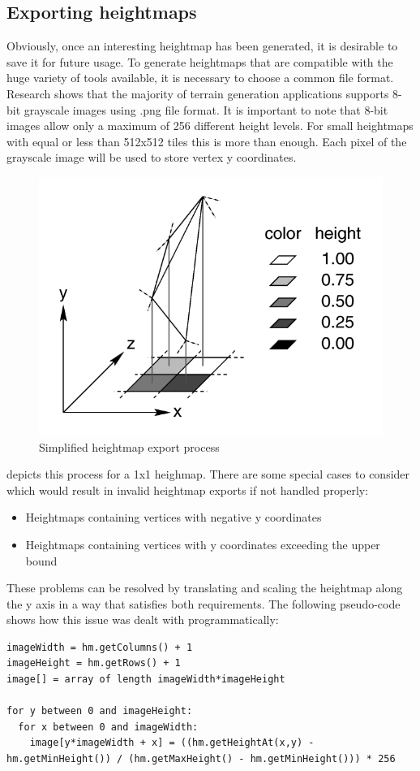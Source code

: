 \documentclass[11pt,a4paper,twoside,openright]{report}
\begin{document}
\subsection{Exporting heightmaps}
\label{subsec:exportingheightmaps}
Obviously, once an interesting heightmap has been generated, it is desirable to save it for future usage. To generate heightmaps that are compatible with the huge variety of tools available, it is necessary to choose a common file format. Research shows that the majority of terrain generation applications supports 8-bit grayscale images using .png file format. It is important to note that 8-bit images allow only a maximum of 256 different height levels. For small heightmaps with equal or less than 512x512 tiles this is more than enough. Each pixel of the grayscale image will be used to store vertex y coordinates.
\begin{figure}[h]
\centering
\includegraphics[width=0.4\linewidth]{pixhfld.png}
\caption{
  Simplified heightmap export process \cite{POVRay:HeightField}
}
\label{fig:heightfield}
\end{figure}
 depicts this process for a 1x1 heighmap. There are some special cases to consider which would result in invalid heightmap exports if not handled properly:
\begin{itemize}
  \item Heightmaps containing vertices with negative y coordinates
  \item Heightmaps containing vertices with y coordinates exceeding the upper bound
\end{itemize}
These problems can be resolved by translating and scaling the heightmap along the y axis in a way that satisfies both requirements. The following pseudo-code shows how this issue was dealt with programmatically:
\begin{lstlisting}[caption=Heightmap export pseudo-code]
imageWidth = hm.getColumns() + 1
imageHeight = hm.getRows() + 1
image[] = array of length imageWidth*imageHeight

for y between 0 and imageHeight:
  for x between 0 and imageWidth:
    image[y*imageWidth + x] = ((hm.getHeightAt(x,y) - hm.getMinHeight()) / (hm.getMaxHeight() - hm.getMinHeight())) * 256
\end{lstlisting}
\end{document}
